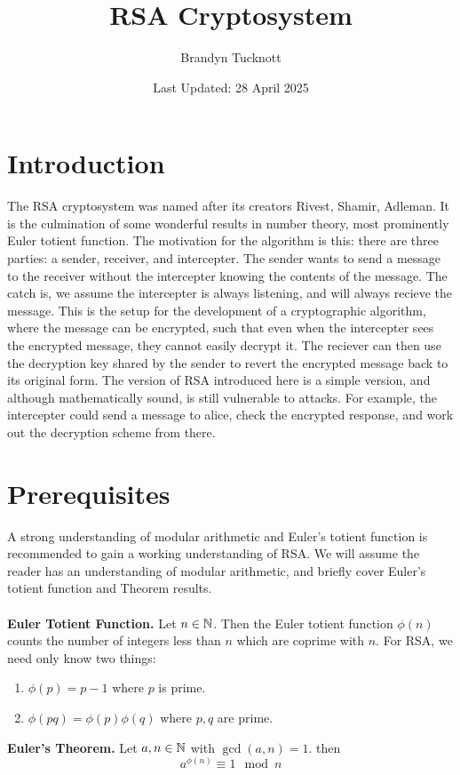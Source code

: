 \documentclass{exam}
\title{RSA Cryptosystem}
\author{Brandyn Tucknott}
\date{Last Updated: 28 April 2025}
\begin{document}
\maketitle

\section*{Introduction}
The RSA cryptosystem was named after its creators Rivest, Shamir, Adleman. It is
the culmination of some wonderful results in number theory, most prominently Euler totient function. The motivation for the algorithm is this: there are
three parties: a sender, receiver, and intercepter. The sender wants to send a 
message to the receiver without the intercepter knowing the contents of the 
message. The catch is, we assume the intercepter is always listening, and will always 
recieve the message. This is the setup for the development of a cryptographic algorithm,
where the message can be encrypted, such that even when the intercepter sees the encrypted 
message, they cannot easily decrypt it. The reciever can then use the decryption key shared by the
sender to revert the encrypted message back to its original form. The version of RSA introduced here is
a simple version, and although mathematically sound, is still vulnerable to attacks. For example, 
the intercepter could send a message to alice, check the encrypted response, and work out the decryption
scheme from there.

\section*{Prerequisites}
A strong understanding of modular arithmetic and Euler's totient function is recommended to gain
a working understanding of RSA. We will assume the reader has an understanding of modular arithmetic,
and briefly cover Euler's totient function and Theorem results.
\\\\
\textbf{Euler Totient Function.} Let $n\in\mathbb {N}$. Then the Euler totient function $\phi (n)$ counts
the number of integers less than $n$ which are coprime with $n$. For RSA, we need only know two
things:
\begin{enumerate}
    \item $\phi(p) = p - 1$ where $p$ is prime.
    \item $\phi(pq) = \phi(p)\phi(q)$ where $p,q$ are prime.
\end{enumerate}
\textbf{Euler's Theorem.} Let $a,n\in\mathbb {N}$ with $\gcd(a, n) = 1$. then
$$a^{\phi(n)} \equiv 1 \mod n$$
\end{document}
